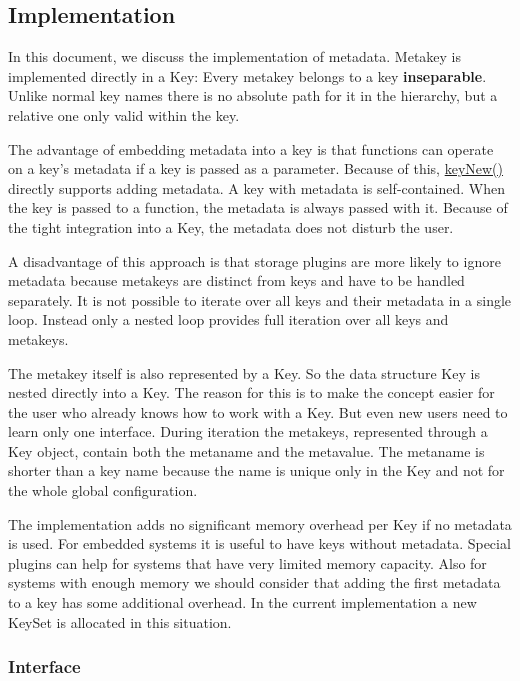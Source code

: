 \subsection*{Implementation}

In this document, we discuss the implementation of metadata. Metakey is implemented directly in a {\ttfamily Key}\+: Every metakey belongs to a key {\bfseries inseparable}. Unlike normal key names there is no absolute path for it in the hierarchy, but a relative one only valid within the key.

The advantage of embedding metadata into a key is that functions can operate on a key's metadata if a key is passed as a parameter. Because of this, {\ttfamily \hyperlink{group__key_gad23c65b44bf48d773759e1f9a4d43b89}{key\+New()}} directly supports adding metadata. A key with metadata is self-\/contained. When the key is passed to a function, the metadata is always passed with it. Because of the tight integration into a {\ttfamily Key}, the metadata does not disturb the user.

A disadvantage of this approach is that storage plugins are more likely to ignore metadata because metakeys are distinct from keys and have to be handled separately. It is not possible to iterate over all keys and their metadata in a single loop. Instead only a nested loop provides full iteration over all keys and metakeys.

The metakey itself is also represented by a {\ttfamily Key}. So the data structure {\ttfamily Key} is nested directly into a {\ttfamily Key}. The reason for this is to make the concept easier for the user who already knows how to work with a {\ttfamily Key}. But even new users need to learn only one interface. During iteration the metakeys, represented through a {\ttfamily Key} object, contain both the metaname and the metavalue. The metaname is shorter than a key name because the name is unique only in the {\ttfamily Key} and not for the whole global configuration.

The implementation adds no significant memory overhead per {\ttfamily Key} if no metadata is used. For embedded systems it is useful to have keys without metadata. Special plugins can help for systems that have very limited memory capacity. Also for systems with enough memory we should consider that adding the first metadata to a key has some additional overhead. In the current implementation a new {\ttfamily Key\+Set} is allocated in this situation.

\subsubsection*{Interface}

